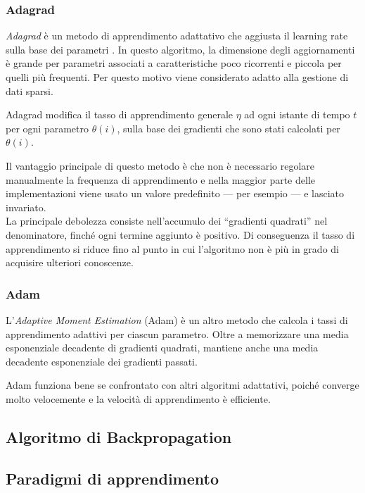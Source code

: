 \subsubsection{Adagrad}
\label{subsubsec:adagrad}

\emph{Adagrad} è un metodo di apprendimento adattativo che aggiusta il learning rate sulla base dei parametri \cite{duchi2011adaptive} .
In questo algoritmo, la dimensione degli aggiornamenti è grande per parametri associati a caratteristiche poco ricorrenti e piccola per quelli più frequenti. Per questo motivo viene considerato adatto alla gestione di dati sparsi.

Adagrad modifica il tasso di apprendimento generale $\eta$ ad ogni istante di tempo $t$ per ogni parametro $\theta(i)$, sulla base dei gradienti che sono stati calcolati per $\theta(i)$.

Il vantaggio principale di questo metodo è che non è necessario regolare manualmente la frequenza di apprendimento e nella maggior parte delle implementazioni viene usato un valore predefinito --- per esempio  --- e lasciato invariato.\\
La principale debolezza consiste nell'accumulo dei ``gradienti quadrati'' nel denominatore, finché ogni termine aggiunto è positivo. Di conseguenza il tasso di apprendimento si riduce fino al punto in cui l'algoritmo non è più in grado di acquisire ulteriori conoscenze. 


\subsubsection{Adam}
\label{subsubsec:adam}

L'\emph{Adaptive Moment Estimation} (Adam) è un altro metodo che calcola i tassi di apprendimento adattivi per ciascun parametro. Oltre a memorizzare una media esponenziale decadente di gradienti quadrati, mantiene anche una media decadente esponenziale dei gradienti passati.

Adam funziona bene se confrontato con altri algoritmi adattativi, poiché converge molto velocemente e la velocità di apprendimento è efficiente.


{\color{blue}
	\subsection{Algoritmo di Backpropagation}
	\label{subsec:backprop}}

\subsection{Paradigmi di apprendimento}
\label{subsec:Paradigmi di apprendimento}

